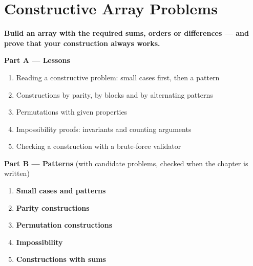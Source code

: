 \chapter{Constructive Array Problems}
\label{ch:constructive}

\begin{tcolorbox}[enhanced, colback=white, colframe=secondaryblue, boxrule=1pt, arc=2mm]
\textbf{\large\textcolor{primaryblue}{Build an array with the required sums, orders or differences --- and prove that your construction always works.}}
\end{tcolorbox}


\begin{plannedbox}
\textbf{Part A --- Lessons}
\begin{enumerate}[leftmargin=*, label=\textbf{A\arabic*.}, itemsep=1pt]
    \item Reading a constructive problem: small cases first, then a pattern
    \item Constructions by parity, by blocks and by alternating patterns
    \item Permutations with given properties
    \item Impossibility proofs: invariants and counting arguments
    \item Checking a construction with a brute-force validator
\end{enumerate}
\textbf{Part B --- Patterns} (with candidate problems, checked when the chapter is written)
\begin{enumerate}[leftmargin=*, label=\textbf{P\arabic*.}, itemsep=1pt]
    \item \textbf{Small cases and patterns}
    \item \textbf{Parity constructions}
    \item \textbf{Permutation constructions}
    \item \textbf{Impossibility}
    \item \textbf{Constructions with sums}
\end{enumerate}
\end{plannedbox}
